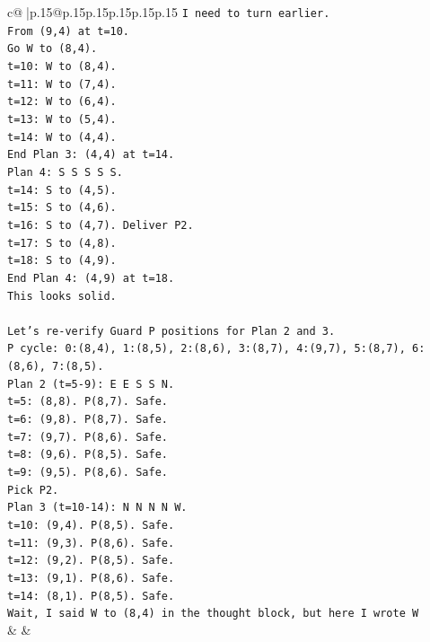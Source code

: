 \documentclass{article}
\begin{document}
{\begin{supertabular}{c@{$\;$}|p{.15\linewidth}@{}p{.15\linewidth}p{.15\linewidth}p{.15\linewidth}p{.15\linewidth}p{.15\linewidth}}
{{{\texttt{I need to turn earlier.} \\
\texttt{From (9,4) at t=10.} \\
\texttt{Go W to (8,4).} \\
\texttt{t=10: W to (8,4).} \\
\texttt{t=11: W to (7,4).} \\
\texttt{t=12: W to (6,4).} \\
\texttt{t=13: W to (5,4).} \\
\texttt{t=14: W to (4,4).} \\
\texttt{End Plan 3: (4,4) at t=14.} \\
\texttt{Plan 4: S S S S S.} \\
\texttt{t=14: S to (4,5).} \\
\texttt{t=15: S to (4,6).} \\
\texttt{t=16: S to (4,7). Deliver P2.} \\
\texttt{t=17: S to (4,8).} \\
\texttt{t=18: S to (4,9).} \\
\texttt{End Plan 4: (4,9) at t=18.} \\
\texttt{This looks solid.} \\
\\ 
\texttt{Let's re{-}verify Guard P positions for Plan 2 and 3.} \\
\texttt{P cycle: 0:(8,4), 1:(8,5), 2:(8,6), 3:(8,7), 4:(9,7), 5:(8,7), 6:(8,6), 7:(8,5).} \\
\texttt{Plan 2 (t=5{-}9): E E S S N.} \\
\texttt{t=5: (8,8). P(8,7). Safe.} \\
\texttt{t=6: (9,8). P(8,7). Safe.} \\
\texttt{t=7: (9,7). P(8,6). Safe.} \\
\texttt{t=8: (9,6). P(8,5). Safe.} \\
\texttt{t=9: (9,5). P(8,6). Safe.} \\
\texttt{Pick P2.} \\
\texttt{Plan 3 (t=10{-}14): N N N N W.} \\
\texttt{t=10: (9,4). P(8,5). Safe.} \\
\texttt{t=11: (9,3). P(8,6). Safe.} \\
\texttt{t=12: (9,2). P(8,5). Safe.} \\
\texttt{t=13: (9,1). P(8,6). Safe.} \\
\texttt{t=14: (8,1). P(8,5). Safe.} \\
\texttt{Wait, I said W to (8,4) in the thought block, but here I wrote W} \\
            }
        }
    }
    & & \\ \\


\end{supertabular}}
\end{document}
